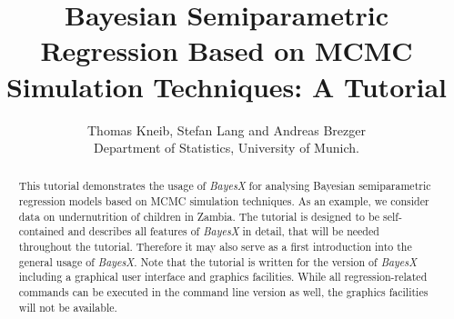 \documentclass[a4paper]{article}
\begin{document}
\title{Bayesian Semiparametric Regression Based on MCMC Simulation Techniques: A Tutorial}
\author{Thomas Kneib, Stefan Lang and Andreas Brezger\\ [.25cm]
\normalsize Department of Statistics, University of Munich. }
\maketitle

\begin{abstract}
This tutorial demonstrates the usage of {\it BayesX} for analysing Bayesian semiparametric regression models based on MCMC
simulation techniques. As an example, we consider data on undernutrition of children in Zambia. The tutorial is designed to be
self-contained and describes all features of {\it BayesX} in detail, that will be needed throughout the tutorial. Therefore it
may also serve as a first introduction into the general usage of {\it BayesX}. Note that the tutorial is written for the
version of {\it BayesX} including a graphical user interface and graphics facilities. While all regression-related commands can
be executed in the command line version as well, the graphics facilities will not be available.
\end{abstract}

\tableofcontents

\newpage



\end{document}
